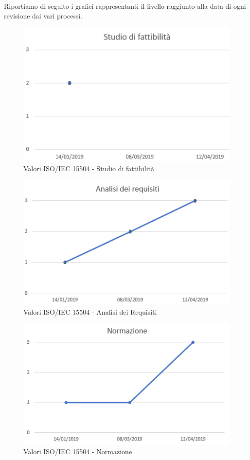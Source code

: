 Riportiamo di seguito i grafici rappresentanti il livello raggiunto alla data di ogni revisione dai vari processi.


\begin{figure}[H]
	\centering
	\includegraphics[scale=1]{images/resoconto/Studio.png}
	\caption{Valori ISO/IEC 15504 - Studio di fattibilità}	
\end{figure}


\begin{figure}[H]
	\centering
	\includegraphics[scale=1]{images/resoconto/Analisi.png}
	\caption{Valori ISO/IEC 15504 - Analisi dei Requisiti}	
\end{figure}


\begin{figure}[H]
	\centering
	\includegraphics[scale=1]{images/resoconto/Normazione.png}
	\caption{Valori ISO/IEC 15504 - Normazione}	
\end{figure}


